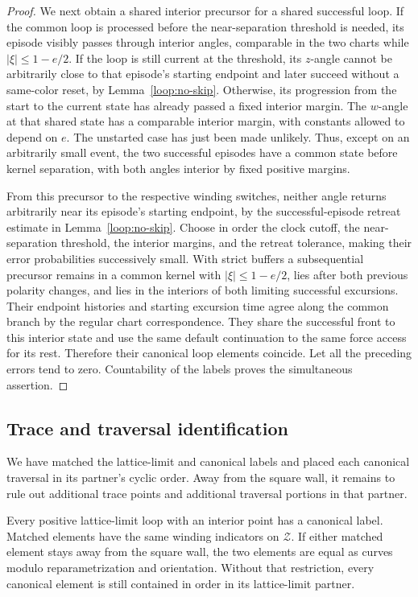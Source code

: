 \begin{proof}
We next obtain a shared interior precursor for a shared successful
loop.  If the common loop is processed before the near-separation
threshold is needed, its episode visibly passes through interior
angles, comparable in the two charts while $|\xi|\le1-e/2$.
If the loop is still current at the threshold, its $z$-angle cannot
be arbitrarily close to that episode's starting endpoint and later
succeed without a same-color reset, by Lemma~\ref{loop:no-skip}.
Otherwise, its progression from the start to the current state has
already passed a fixed interior margin.  The $w$-angle at that shared
state has a comparable interior margin, with constants allowed to
depend on $e$.  The unstarted case has just been made unlikely.
Thus, except on an arbitrarily small event, the two successful
episodes have a common state before kernel separation, with both
angles interior by fixed positive margins.

From this precursor to the respective winding switches, neither angle
returns arbitrarily near its episode's starting endpoint, by the
successful-episode retreat estimate in Lemma~\ref{loop:no-skip}.
Choose in order the clock cutoff, the near-separation threshold, the
interior margins, and the retreat tolerance, making their error
probabilities successively small.  With strict buffers a subsequential
precursor remains in a common kernel with $|\xi|\le1-e/2$, lies after
both previous polarity changes, and lies in the interiors of both
limiting successful excursions.  Their endpoint histories and starting
excursion time agree along the common branch by the regular chart
correspondence.  They share the successful front to this interior
state and use the same default continuation to the same force access
for its rest.  Therefore their canonical loop elements coincide.
Let all the preceding errors tend to zero.  Countability of the
labels proves the simultaneous assertion.
\end{proof}

\subsection{Trace and traversal identification}
\label{loop:traversals}

We have matched the lattice-limit and canonical labels and placed each
canonical traversal in its partner's cyclic order.  Away from the
square wall, it remains to rule out additional trace points and
additional traversal portions in that partner.

\begin{proposition}
\label{loop:identification}
Every positive lattice-limit loop with an interior point has a
canonical label.  Matched elements have the same winding indicators
on $\mathcal Z$.  If either matched element stays away from the square
wall, the two elements are equal as curves modulo reparametrization
and orientation.  Without that restriction, every canonical element
is still contained in order in its lattice-limit partner.
\end{proposition}


